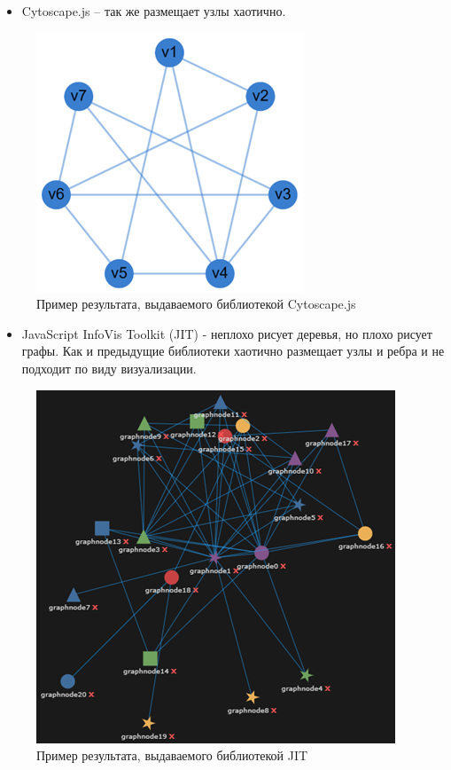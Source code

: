 \begin{itemize}
\item Cytoscape.js – так же размещает узлы хаотично.
\end{itemize}
\begin{figure}[h]
	\center
	\includegraphics [scale=0.9] {my_folder/images/my/15}
	\caption{Пример результата, выдаваемого библиотекой Cytoscape.js}
	\label{fig:15}
\end{figure}
\begin{itemize}
\item JavaScript InfoVis Toolkit (JIT) - неплохо рисует деревья, но плохо рисует графы. Как и предыдущие библиотеки хаотично размещает узлы и ребра и не подходит по виду визуализации.
\end{itemize}
\begin{figure}[h]
	\center
	\includegraphics [scale=0.9] {my_folder/images/my/16}
	\caption{Пример результата, выдаваемого библиотекой JIT}
	\label{fig:16}
\end{figure}
